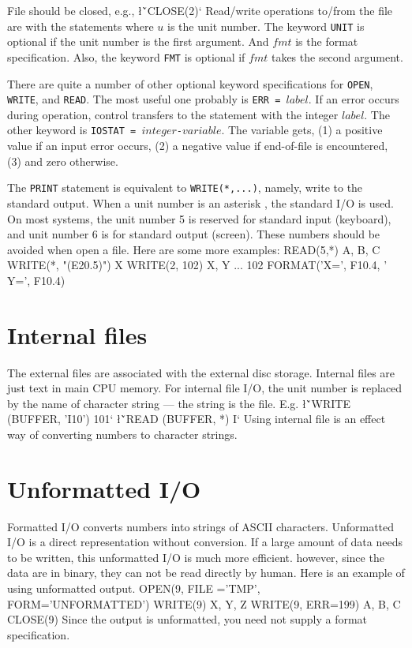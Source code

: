 {File should be closed, e.g., 
\sms
\l{\v`CLOSE(2)`}
\sms
Read/write operations to/from the file are with the statements
\sms
{}
\sms
where $u$ is the unit number.  The keyword {\tt UNIT} is optional if
the unit number is the first argument.  And  $fmt$ is the format
specification.   Also, the keyword {\tt FMT} is optional if 
$fmt$ takes the second argument. 

There are quite a number of other optional keyword specifications
for {\tt OPEN}, {\tt WRITE}, and {\tt READ}.   The most
useful one probably is {\tt ERR = $label$}.  If an error occurs
during operation, control transfers to the statement with the integer
$label$.  The other keyword is  {\tt IOSTAT = $integer$-$variable$}.  
The variable gets, (1) a positive value if an input error occurs, (2)
a negative value if end-of-file is encountered, (3) and zero
otherwise. 

The {\tt PRINT} statement is equivalent to {\tt WRITE(*,...)},
namely, write to the standard output.  When a unit number is an
asterisk {\tt *}, the standard I/O is used.   On most systems, the
unit number 5 is reserved for standard input (keyboard), and 
unit number 6 is for standard output (screen).  These numbers should
be avoided when open a file.  Here are some more examples:
\ttbg
    READ(5,*) A, B, C
    WRITE(*, "(E20.5)") X
    WRITE(2, 102) X, Y
    ...
102 FORMAT('X=', F10.4, ' Y=', F10.4)
\tted

\section{Internal files}
The external files are associated with the external disc storage. 
Internal files are just text in main CPU memory.  For internal file
I/O, the unit number is replaced by the name of character string --- the
string is the file.  E.g.
\sms
{}
\l{\v`WRITE (BUFFER, 'I10') 101`}
\l{\v`READ (BUFFER, *) I`}
\sms
Using internal file is an effect way of converting numbers to 
character strings.

\section{Unformatted I/O}
Formatted I/O converts numbers into strings of ASCII characters.  Unformatted
I/O is a direct representation without conversion.  If a large amount of
data needs to be written, this unformatted I/O is much more efficient.
however, since the data are in binary, they can not be read directly
by human.  Here is an example of using unformatted output.
\ttbg
OPEN(9, FILE ='TMP', FORM='UNFORMATTED')
WRITE(9) X, Y, Z
WRITE(9, ERR=199) A, B, C
CLOSE(9)
\tted
Since the output is unformatted, you need not supply a format 
specification.

}
